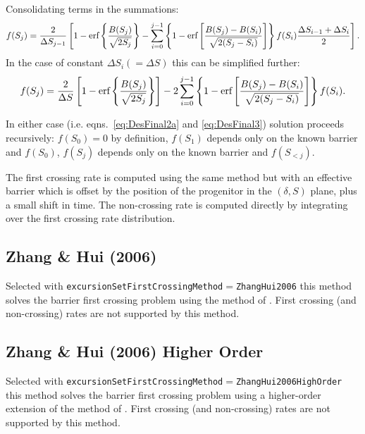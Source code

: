 Consolidating terms in the summations:
\begin{equation} \label{eq:DesFinal2a}
   f(S_j) = {2 \over \Delta S_{j-1}}\left[1 -  \hbox{erf}\left\{\frac{B(S_j)}{\sqrt{2S_j}}\right\} - \sum_{i=0}^{j-1} \left\{ 1-\hbox{erf}\left[\frac{B(S_j) - B(S_i)}{\sqrt{2 (S_j-S_i)}}\right] \right\} f(S_i) {\Delta S_{i-1} + \Delta S_i \over 2} \right].
\end{equation}
In the case of constant $\Delta S_i(=\Delta S)$ this can be simplified further:
\begin{equation} \label{eq:DesFinal3}
   f(S_j) = {2 \over \Delta S}\left[1 - \hbox{erf}\left\{\frac{B(S_j)}{\sqrt{2S_j}}\right\}\right] - 2 \sum_{i=0}^{j-1} \left\{1- \hbox{erf}\left[\frac{B(S_j) - B(S_i)}{\sqrt{2 (S_j-S_i)}}\right] \right\} f(S_i).
\end{equation}

In either case (i.e. eqns.~\ref{eq:DesFinal2a} and \ref{eq:DesFinal3}) solution proceeds recursively: $f(S_0)=0$ by definition, $f(S_1)$ depends only on the known barrier and $f(S_0)$, $f(S_j)$ depends only on the known barrier and $f(S_{<j})$.

The first crossing rate is computed using the same method but with an effective barrier which is offset by the position of the progenitor in the $(\delta,S)$ plane, plus a small shift in time. The non-crossing rate is computed directly by integrating over the first crossing rate distribution.

\subsection{Zhang \& Hui (2006)}

Selected with {\tt excursionSetFirstCrossingMethod}$=${\tt ZhangHui2006} this method solves the barrier first crossing problem using the method of \cite{zhang_random_2006}. First crossing (and non-crossing) rates are not supported by this method.

\subsection{Zhang \& Hui (2006) Higher Order}

Selected with {\tt excursionSetFirstCrossingMethod}$=${\tt ZhangHui2006HighOrder} this method solves the barrier first crossing problem using a higher-order extension of the method of \cite{zhang_random_2006}. First crossing (and non-crossing) rates are not supported by this method.

